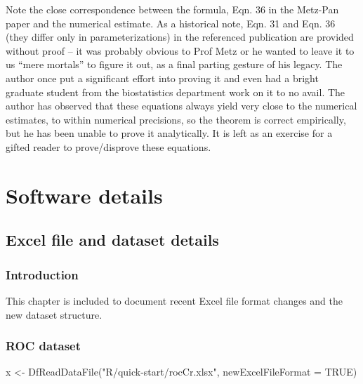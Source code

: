 \documentclass[
]{book}
\newenvironment{Shaded}{\begin{snugshade}}{\end{snugshade}}
\newcommand{\AttributeTok}[1]{\textcolor[rgb]{0.77,0.63,0.00}{#1}}
\newcommand{\ConstantTok}[1]{\textcolor[rgb]{0.00,0.00,0.00}{#1}}
\newcommand{\FunctionTok}[1]{\textcolor[rgb]{0.00,0.00,0.00}{#1}}
\newcommand{\NormalTok}[1]{#1}
\newcommand{\OtherTok}[1]{\textcolor[rgb]{0.56,0.35,0.01}{#1}}
\newcommand{\StringTok}[1]{\textcolor[rgb]{0.31,0.60,0.02}{#1}}
\begin{document}
Note the close correspondence between the formula, Eqn. 36 in the Metz-Pan paper and the numerical estimate. As a historical note, Eqn. 31 and Eqn. 36 (they differ only in parameterizations) in the referenced publication are provided without proof -- it was probably obvious to Prof Metz or he wanted to leave it to us ``mere mortals'' to figure it out, as a final parting gesture of his legacy. The author once put a significant effort into proving it and even had a bright graduate student from the biostatistics department work on it to no avail. The author has observed that these equations always yield very close to the numerical estimates, to within numerical precisions, so the theorem is correct empirically, but he has been unable to prove it analytically. It is left as an exercise for a gifted reader to prove/disprove these equations.

\hypertarget{part-software-details}{%
\part*{Software details}\label{part-software-details}}

\hypertarget{dataset-object-details}{%
\chapter{Excel file and dataset details}\label{dataset-object-details}}

\hypertarget{introduction-3}{%
\section{Introduction}\label{introduction-3}}

This chapter is included to document recent Excel file format changes and the new dataset structure.

\hypertarget{dataset-object-details-roc-dataset}{%
\section{ROC dataset}\label{dataset-object-details-roc-dataset}}

\begin{Shaded}
\begin{Highlighting}[]
\NormalTok{x }\OtherTok{\textless{}{-}} \FunctionTok{DfReadDataFile}\NormalTok{(}\StringTok{"R/quick{-}start/rocCr.xlsx"}\NormalTok{, }\AttributeTok{newExcelFileFormat =} \ConstantTok{TRUE}\NormalTok{)}
\end{Highlighting}
\end{Shaded}
\end{document}
